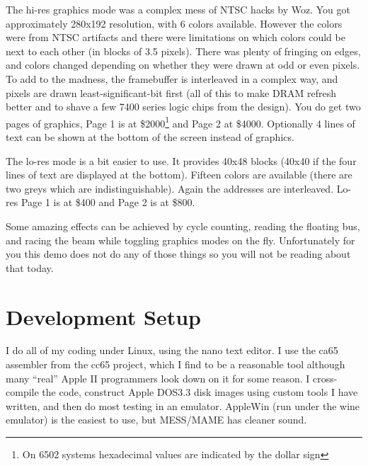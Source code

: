 \documentclass[twocolumn]{article}
\begin{document}
The hi-res graphics mode was a complex mess of NTSC hacks by Woz.
You got approximately 280x192 resolution, with 6 colors available.
However the colors were from NTSC artifacts and there were limitations 
on which colors could be next to each other (in blocks of 3.5 pixels).
There was plenty of fringing on edges, and colors changed depending on
whether they were drawn at odd or even pixels.
To add to the madness, the framebuffer is interleaved in a complex way,
and pixels are drawn least-significant-bit first (all of this to make
DRAM refresh better and to shave a few 7400 series logic chips from the design).
You do get two pages of graphics, Page 1 is at
\$2000\footnote{On 6502 systems hexadecimal values are 
indicated by the dollar sign}
and Page 2 at \$4000.
Optionally 4 lines of text can be shown at the bottom of the
screen instead of graphics.

The lo-res mode is a bit easier to use.  
It provides 40x48 blocks (40x40 if the four
lines of text are displayed at the bottom).
Fifteen colors are available (there are two greys which are indistinguishable).
Again the addresses are interleaved.  Lo-res Page 1 is at \$400
and Page 2 is at \$800.

Some amazing effects can be achieved by cycle counting, reading
the floating bus, and racing the beam while toggling graphics
modes on the fly.
Unfortunately for you this demo does not do any of those things
so you will not be reading about that today.




\section{Development Setup}

I do all of my coding under Linux, using the nano text editor.
I use the ca65 assembler from the cc65 project, which I find to be a reasonable
tool although many ``real'' Apple II programmers look down on it for some
reason.
I cross-compile the code, construct Apple DOS3.3 disk images using
custom tools I have written, and then do most testing in an emulator.
AppleWin (run under the wine emulator) is the easiest to use, but
MESS/MAME has cleaner sound.
\end{document}
